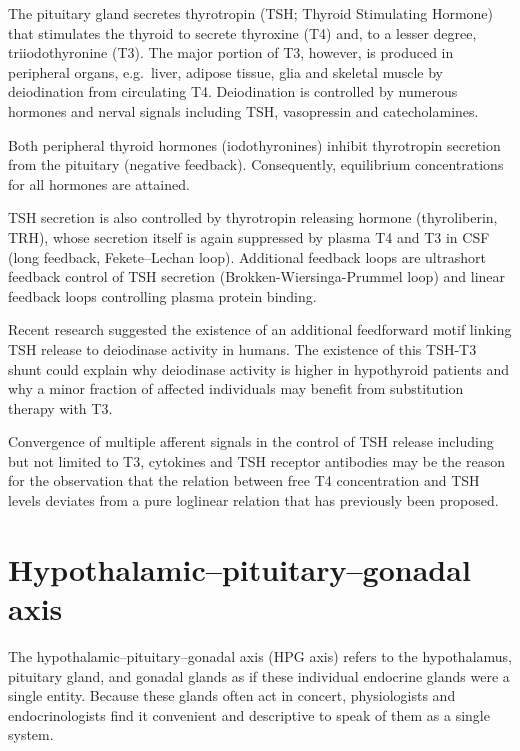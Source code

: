 The pituitary gland secretes thyrotropin (TSH; Thyroid Stimulating Hormone) that stimulates the thyroid to secrete thyroxine (T4) and, to a lesser degree, triiodothyronine (T3). The major portion of T3, however, is produced in peripheral organs, e.g.~liver, adipose tissue, glia and skeletal muscle by deiodination from circulating T4. Deiodination is controlled by numerous hormones and nerval signals including TSH, vasopressin and catecholamines.

Both peripheral thyroid hormones (iodothyronines) inhibit thyrotropin secretion from the pituitary (negative feedback). Consequently, equilibrium concentrations for all hormones are attained.

TSH secretion is also controlled by thyrotropin releasing hormone (thyroliberin, TRH), whose secretion itself is again suppressed by plasma T4 and T3 in CSF (long feedback, Fekete--Lechan loop). Additional feedback loops are ultrashort feedback control of TSH secretion (Brokken-Wiersinga-Prummel loop) and linear feedback loops controlling plasma protein binding.

Recent research suggested the existence of an additional feedforward motif linking TSH release to deiodinase activity in humans. The existence of this TSH-T3 shunt could explain why deiodinase activity is higher in hypothyroid patients and why a minor fraction of affected individuals may benefit from substitution therapy with T3.

Convergence of multiple afferent signals in the control of TSH release including but not limited to T3, cytokines and TSH receptor antibodies may be the reason for the observation that the relation between free T4 concentration and TSH levels deviates from a pure loglinear relation that has previously been proposed.

\hypertarget{hypothalamicpituitarygonadal-axis}{%
\section{Hypothalamic--pituitary--gonadal axis}\label{hypothalamicpituitarygonadal-axis}}

The hypothalamic--pituitary--gonadal axis (HPG axis) refers to the hypothalamus, pituitary gland, and gonadal glands as if these individual endocrine glands were a single entity. Because these glands often act in concert, physiologists and endocrinologists find it convenient and descriptive to speak of them as a single system.



